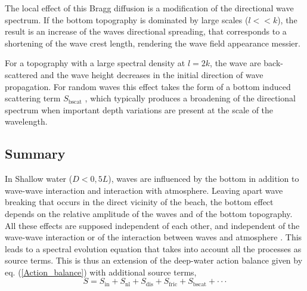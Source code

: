 The local effect of this Bragg diffusion is a modification of the
directional wave spectrum. If the bottom topography is dominated
by large scales ($l<< k$), the result is an increase of the waves directional
spreading, that corresponds to a shortening of the wave crest length,
rendering the wave field appearance messier.

For a topography with a large spectral density at $l=2k$, the wave
are back-scattered \citep{Heathershaw1982}
and the wave height decreases in the initial direction of wave 
propagation. For random waves this effect takes the form of 
 a bottom induced scattering term  $S_{\mathrm{bscat}}$ \citep{Ardhuin&Magne2007}, which typically 
 produces a broadening of the directional spectrum when important depth variations are present at the scale 
 of the wavelength.

\subsection{Summary}
In Shallow water ($D <0,5 L$), waves are influenced by the bottom in addition
to wave-wave interaction and interaction with atmosphere. Leaving apart wave breaking
that occurs in the direct vicinity of the beach, the bottom effect depends on the 
relative amplitude of the waves and of the bottom topography. All these effects
are supposed independent of each other, and independent of the wave-wave interaction
or of the interaction between waves and atmosphere \citep[e.g.][]{WAMBook}. 
This leads to a spectral evolution equation that takes
into account all the processes as source terms. This is thus an extension of 
the deep-water action balance given by eq. (\ref{Action_balance}) with additional source terms, 
\begin{equation}
S=S_{\mathrm{in}}+S_{\mathrm{nl}}+S_{\mathrm{dis}}+S_{\mathrm{fric}}
    +S_{\mathrm{bscat}}+ \cdot \cdot \cdot
\end{equation}

